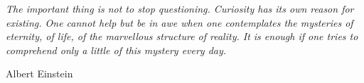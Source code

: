 \documentclass[12pt,a4paper]{article}
\begin{document}
    

    \restoregeometry %

\newpage
    \thispagestyle{empty} 
    \pagebreak
    \hspace{0pt}
    \vfill
    \begin{flushright}
        \textit{The important thing is not to stop questioning. Curiosity has its own reason for existing. One cannot help but be in awe when one contemplates the mysteries of eternity, of life, of the marvellous structure of reality. It is enough if one tries to comprehend only a little of this mystery every day.}\\
    
        \vspace{0.3em}
        
        \large{Albert Einstein}
    
    \end{flushright}
    \vfill
    \hspace{0pt}
\pagebreak

\setcounter{page}{1} %



\newpage

\tableofcontents
\newpage

\listoffigures
\newpage

\listoftables
\newpage


\setcounter{page}{1} %



\newpage



\newpage

%

\newpage



\newpage



\newpage





\end{document}
